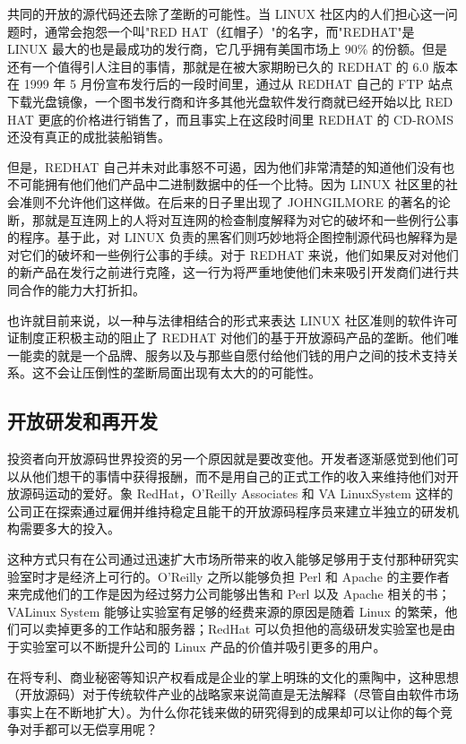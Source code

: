 共同的开放的源代码还去除了垄断的可能性。当 LINUX 社区内的人们担心这一问题时，通常会抱怨一个叫"RED HAT（红帽子）"的名字，而"REDHAT"是 LINUX 最大的也是最成功的发行商，它几乎拥有美国市场上 90\% 的份额。但是还有一个值得引人注目的事情，那就是在被大家期盼已久的 REDHAT 的 6.0 版本在 1999 年 5 月份宣布发行后的一段时间里，通过从 REDHAT 自己的 FTP 站点下载光盘镜像，一个图书发行商和许多其他光盘软件发行商就已经开始以比 RED HAT 更底的价格进行销售了，而且事实上在这段时间里 REDHAT 的 CD-ROMS 还没有真正的成批装船销售。


但是，REDHAT 自己并未对此事怒不可遏，因为他们非常清楚的知道他们没有也不可能拥有他们他们产品中二进制数据中的任一个比特。因为 LINUX 社区里的社会准则不允许他们这样做。在后来的日子里出现了 JOHNGILMORE 的著名的论断，那就是互连网上的人将对互连网的检查制度解释为对它的破坏和一些例行公事的程序。基于此，对 LINUX 负责的黑客们则巧妙地将企图控制源代码也解释为是对它们的破坏和一些例行公事的手续。对于 REDHAT 来说，他们如果反对对他们的新产品在发行之前进行克隆，这一行为将严重地使他们未来吸引开发商们进行共同合作的能力大打折扣。


也许就目前来说，以一种与法律相结合的形式来表达 LINUX 社区准则的软件许可证制度正积极主动的阻止了 REDHAT 对他们的基于开放源码产品的垄断。他们唯一能卖的就是一个品牌、服务以及与那些自愿付给他们钱的用户之间的技术支持关系。这不会让压倒性的垄断局面出现有太大的的可能性。

\subsection{开放研发和再开发}
投资者向开放源码世界投资的另一个原因就是要改变他。开发者逐渐感觉到他们可以从他们想干的事情中获得报酬，而不是用自己的正式工作的收入来维持他们对开放源码运动的爱好。象 RedHat，O'Reilly Associates 和 VA LinuxSystem 这样的公司正在探索通过雇佣并维持稳定且能干的开放源码程序员来建立半独立的研发机构需要多大的投入。


这种方式只有在公司通过迅速扩大市场所带来的收入能够足够用于支付那种研究实验室时才是经济上可行的。O'Reilly 之所以能够负担 Perl 和 Apache 的主要作者来完成他们的工作是因为经过努力公司能够出售和 Perl 以及 Apache 相关的书；VALinux System 能够让实验室有足够的经费来源的原因是随着 Linux 的繁荣，他们可以卖掉更多的工作站和服务器；RedHat 可以负担他的高级研发实验室也是由于实验室可以不断提升公司的 Linux 产品的价值并吸引更多的用户。


在将专利、商业秘密等知识产权看成是企业的掌上明珠的文化的熏陶中，这种思想（开放源码）对于传统软件产业的战略家来说简直是无法解释（尽管自由软件市场事实上在不断地扩大）。为什么你花钱来做的研究得到的成果却可以让你的每个竞争对手都可以无偿享用呢？



